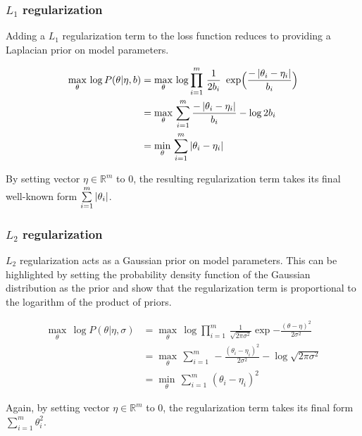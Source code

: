 	\subsubsection{$L_1$ regularization}

	   Adding a $L_1$ regularization term to the loss function reduces to providing a Laplacian
	   prior on model parameters.

	   \begin{align}
	       \max_{\theta}\, \log{P(\theta \vert \eta, b)}
		   & = \max_{\theta}\, \log{\prod\limits_{i=1}^m \, \frac{1}{2b_i}\,
		   \text{ exp}\Big(\frac{- \left|\theta_i - \eta_i\right|}{b_i}\Big)} \\
		   & = \max_{\theta}\, \sum\limits_{i=1}^m \frac{- \left|\theta_i - \eta_i\right|}{b_i} - \log{2b_i} \\
		   & = \min_{\theta}\, \sum\limits_{i=1}^m \left|\theta_i - \eta_i\right|
	   \end{align}

	   By setting vector $\eta \in \mathbb{R}^m$ to $0$, the resulting regularization term
	   takes its final well-known form $\sum\limits_{i=1}^m \left|\theta_i\right|$.

	\subsubsection{$L_2$ regularization}\label{l2regularization}

	   $L_2$ regularization acts as a Gaussian prior on model parameters.
	   This can be highlighted by setting the probability density function of the Gaussian
	   distribution as the prior and show that the regularization term is proportional
	   to the logarithm of the product of priors.

	   \begin{align}
               \max_{\theta}\, \log{P(\theta \vert \eta, \sigma)}
		   & = \max_{\theta}\, \log{\prod\limits_{i=1}^m \, \frac{1}{\sqrt{2\pi\sigma^2}}
		   \exp{-\frac{(\theta - \eta)^2}{2\sigma^2}}} \\
		   & = \max_{\theta}\, \sum\limits_{i=1}^m \, -\frac{(\theta_i - \eta_i)^2}{2\sigma^2}
		   - \log{\sqrt{2\pi\sigma^2}} \\
		   & = \min_{\theta}\, \sum\limits_{i=1}^m \, (\theta_i - \eta_i)^2
           \end{align}

	   Again, by setting vector $\eta \in \mathbb{R}^m$ to $0$, the regularization term takes its
	   final form $\sum\limits_{i=1}^m \theta_i^2$.

